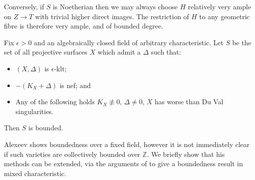 Conversely, if $S$ is Noetherian then we may always choose $H$ relatively very ample on $Z \to T$ with trivial higher direct images. The restriction of $H$ to any geometric fibre is therefore very ample, and of bounded degree. 

\begin{theorem}\cite[Theorem 6.9]{alexeev1994boundedness}\label{BAB}
	Fix $\epsilon >0$ and an algebraically closed field of arbitrary characteristic. Let $S$ be the set of all projective surfaces $X$ which admit a $\Delta$ such that:
	\begin{itemize}
		\item $(X,\Delta)$ is $\epsilon$-klt;
		\item $-(K_{X}+\Delta)$ is nef; and
		\item Any of the following holds $K_{X} \not\equiv 0$, $\Delta \neq 0$, $X$ has worse than Du Val singularities.
	\end{itemize}
	Then $S$ is bounded.
\end{theorem}

Alexeev shows boundedness over a fixed field, however it is not immediately clear if such varieties are collectively bounded over $\mathbb{Z}$. We briefly show that his methods can be extended, via the arguments of \cite{witaszek2015effective} to give a boundedness result in mixed characteristic.

